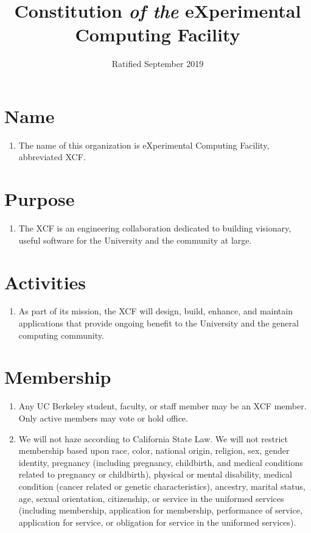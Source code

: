 \documentclass[english,a4paper]{article}
\title{Constitution \textit{of the} eXperimental Computing Facility\vspace{-3ex}}
\date{Ratified September 2019\vspace{-3ex}}
\begin{document}
\maketitle

\section{Name}
\begin{enumerate}
\item The name of this organization is eXperimental Computing Facility,
  abbreviated XCF.
\end{enumerate}
\section{Purpose}

\begin{enumerate}
\item The XCF is an engineering collaboration dedicated to building visionary,
  useful software for the University and the community at large.
\end{enumerate}


\section{Activities}


\begin{enumerate}
\item As part of its mission, the XCF will design, build, enhance, and
  maintain applications that provide ongoing benefit to the University
  and the general computing community.
\end{enumerate}

\section{Membership}

\begin{enumerate}
\item Any UC Berkeley student, faculty, or staff member may be an XCF member.
  Only active members may vote or hold office.

\item We will not haze according to California State Law. We will not restrict
  membership based upon race, color, national origin, religion, sex,
  gender identity, pregnancy (including pregnancy, childbirth, and medical
  conditions related to pregnancy or childbirth), physical or mental
  disability, medical condition (cancer related or genetic characteristics),
  ancestry, marital status, age, sexual orientation, citizenship, or
  service in the uniformed services (including membership, application
  for membership, performance of service, application for service, or
  obligation for service in the uniformed services).
\end{enumerate}
\end{document}
